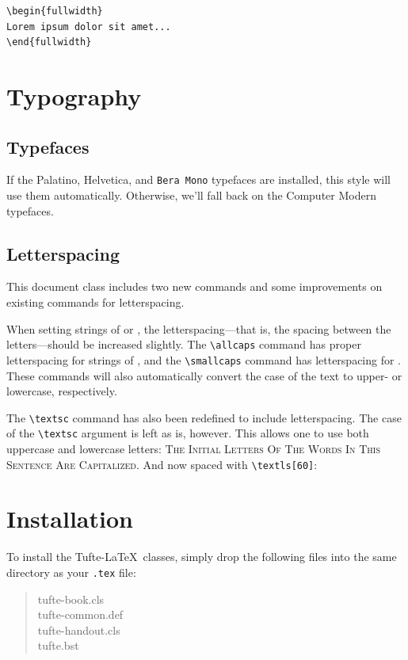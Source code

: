 \begin{Verbatim}
\begin{fullwidth}
Lorem ipsum dolor sit amet...
\end{fullwidth}
\end{Verbatim}

\begin{fullwidth}
\small\itshape\lipsum[1]
\end{fullwidth}

\section{Typography}\label{sec:typography}

\subsection{Typefaces}\label{sec:typefaces}
If the Palatino, \textsf{Helvetica}, and \texttt{Bera Mono} typefaces are installed, this style
will use them automatically.  Otherwise, we'll fall back on the Computer Modern
typefaces.

\subsection{Letterspacing}\label{sec:letterspacing}
This document class includes two new commands and some improvements on
existing commands for letterspacing.

When setting strings of  or , the
letter\-spacing---that is, the spacing between the letters---should be
increased slightly.\cite{Bringhurst2005}  The \Verb|\allcaps| command has proper letterspacing for
strings of , and the \Verb|\smallcaps| command
has letterspacing for .  These commands
will also automatically convert the case of the text to upper- or
lowercase, respectively.

The \Verb|\textsc| command has also been redefined to include
letterspacing.  The case of the \Verb|\textsc| argument is left as is,
however.  This allows one to use both uppercase and lowercase letters:
\textsc{The Initial Letters Of The Words In This Sentence Are Capitalized.}
And now spaced with \Verb|\textls[60]|: 



\section{Installation}\label{sec:installation}
To install the Tufte-\LaTeX\ classes, simply drop the
following files into the same directory as your \texttt{.tex}
file:
\begin{quote}
  \ttfamily
  tufte-book.cls\\
  tufte-common.def\\
  tufte-handout.cls\\
  tufte.bst
\end{quote}

